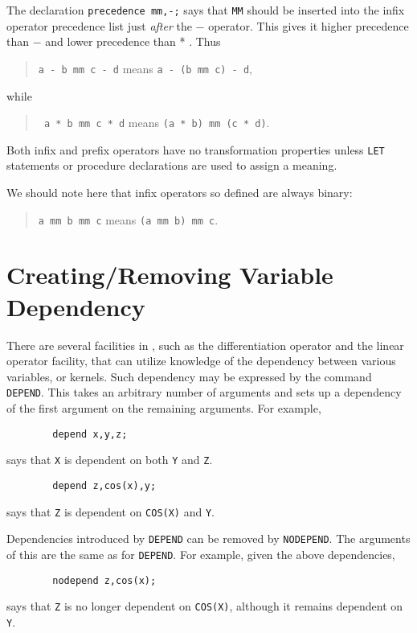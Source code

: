 The declaration \texttt{precedence mm,-;} says that \texttt{MM} should be
inserted into the infix operator precedence list just {\em after\/}
the $-$ operator.  This gives it higher precedence than $-$ and lower
precedence than * .  Thus

\begin{quote}
\hspace{0.2in}\texttt{a - b mm c - d}\hspace{.3in} means \hspace{.3in}
\texttt{a - (b mm c) - d},
\end{quote}
while
\begin{quote}
\hspace{0.2in}\texttt{  a * b mm c * d}\hspace{.3in} means \hspace{.3in}
\texttt{(a * b) mm (c * d)}.
\end{quote}

Both infix and prefix operators have no transformation
properties unless \texttt{LET} statements or procedure
declarations are used to assign a meaning.

We should note here that infix operators so defined are always binary:
\begin{quote}
\hspace{0.2in}\texttt{a mm b mm c}\hspace{.3in} means \hspace{.3in}
\texttt{(a mm b) mm c}.
\end{quote}

\section{Creating/Removing Variable Dependency}
\hypertarget{command:DEPEND}{}
\hypertarget{command:NODEPEND}{}

There are several facilities in {\REDUCE}, such as the differentiation
operator and the linear operator facility, that
can utilize knowledge of the dependency between various variables, or
kernels.  Such dependency may be expressed by the command \texttt{DEPEND}.
This takes an arbitrary number of arguments and
sets up a dependency of the first argument on the remaining arguments.
For example,
\begin{verbatim}
        depend x,y,z;
\end{verbatim}
says that \texttt{X} is dependent on both \texttt{Y} and \texttt{Z}.
\begin{verbatim}
        depend z,cos(x),y;
\end{verbatim}
says that \texttt{Z} is dependent on \texttt{COS(X)} and \texttt{Y}.

Dependencies introduced by \texttt{DEPEND} can be removed by \texttt{NODEPEND}.
 The arguments of this are the same as for \texttt{DEPEND}.
For example, given the above dependencies,
\begin{verbatim}
        nodepend z,cos(x);
\end{verbatim}
says that \texttt{Z} is no longer dependent on \texttt{COS(X)}, although it remains
dependent on \texttt{Y}.

